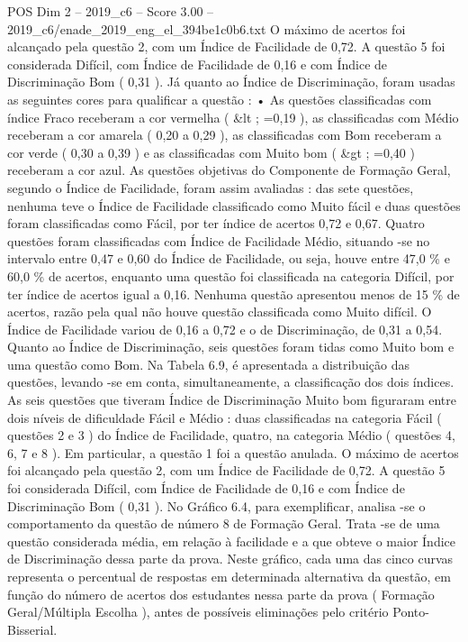 \begin{textsample}{POS Dim 2 – 2019\_c6 – Score 3.00 – 2019\_c6/enade\_2019\_eng\_el\_394be1c0b6.txt}
O máximo de acertos foi alcançado pela questão 2, com um Índice de Facilidade de 0,72.
A questão 5 foi considerada Difícil, com Índice de Facilidade de 0,16 e com Índice de Discriminação Bom ( 0,31 ).
Já quanto ao Índice de Discriminação, foram usadas as seguintes cores para qualificar a questão : • As questões classificadas com índice Fraco receberam a cor vermelha ( \&lt ; =0,19 ), as classificadas com Médio receberam a cor amarela ( 0,20 a 0,29 ), as classificadas com Bom receberam a cor verde ( 0,30 a 0,39 ) e as classificadas com Muito bom ( \&gt ; =0,40 ) receberam a cor azul.
As questões objetivas do Componente de Formação Geral, segundo o Índice de Facilidade, foram assim avaliadas : das sete questões, nenhuma teve o Índice de Facilidade classificado como Muito fácil e duas questões foram classificadas como Fácil, por ter índice de acertos 0,72 e 0,67.
Quatro questões foram classificadas com Índice de Facilidade Médio, situando -se no intervalo entre 0,47 e 0,60 do Índice de Facilidade, ou seja, houve entre 47,0 \% e 60,0 \% de acertos, enquanto uma questão foi classificada na categoria Difícil, por ter índice de acertos igual a 0,16.
Nenhuma questão apresentou menos de 15 \% de acertos, razão pela qual não houve questão classificada como Muito difícil.
O Índice de Facilidade variou de 0,16 a 0,72 e o de Discriminação, de 0,31 a 0,54.
Quanto ao Índice de Discriminação, seis questões foram tidas como Muito bom e uma questão como Bom.
Na Tabela 6.9, é apresentada a distribuição das questões, levando -se em conta, simultaneamente, a classificação dos dois índices.
As seis questões que tiveram Índice de Discriminação Muito bom figuraram entre dois níveis de dificuldade Fácil e Médio : duas classificadas na categoria Fácil ( questões 2 e 3 ) do Índice de Facilidade, quatro, na categoria Médio ( questões 4, 6, 7 e 8 ).
Em particular, a questão 1 foi a questão anulada.
O máximo de acertos foi alcançado pela questão 2, com um Índice de Facilidade de 0,72.
A questão 5 foi considerada Difícil, com Índice de Facilidade de 0,16 e com Índice de Discriminação Bom ( 0,31 ).
No Gráfico 6.4, para exemplificar, analisa -se o comportamento da questão de número 8 de Formação Geral.
Trata -se de uma questão considerada média, em relação à facilidade e a que obteve o maior Índice de Discriminação dessa parte da prova.
Neste gráfico, cada uma das cinco curvas representa o percentual de respostas em determinada alternativa da questão, em função do número de acertos dos estudantes nessa parte da prova ( Formação Geral/Múltipla Escolha ), antes de possíveis eliminações pelo critério Ponto-Bisserial.

\end{textsample}
